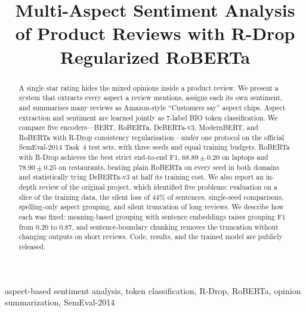 \documentclass[conference]{IEEEtran}
\begin{document}
\title{Multi-Aspect Sentiment Analysis of Product Reviews with R-Drop Regularized RoBERTa}

\author{
\and
{}
\and
{}
\and
{}
}

\maketitle

\begin{abstract}
A single star rating hides the mixed opinions inside a product review. We present a system that extracts every aspect a review mentions, assigns each its own sentiment, and summarises many reviews as Amazon-style ``Customers say'' aspect chips. Aspect extraction and sentiment are learned jointly as 7-label BIO token classification. We compare five encoders---BERT, RoBERTa, DeBERTa-v3, ModernBERT, and RoBERTa with R-Drop consistency regularisation---under one protocol on the official SemEval-2014 Task~4 test sets, with three seeds and equal training budgets. RoBERTa with R-Drop achieves the best strict end-to-end F1, $68.89\pm0.20$ on laptops and $78.90\pm0.25$ on restaurants, beating plain RoBERTa on every seed in both domains and statistically tying DeBERTa-v3 at half its training cost. We also report an in-depth review of the original project, which identified five problems: evaluation on a slice of the training data, the silent loss of 44\% of sentences, single-seed comparisons, spelling-only aspect grouping, and silent truncation of long reviews. We describe how each was fixed: meaning-based grouping with sentence embeddings raises grouping F1 from 0.20 to 0.87, and sentence-boundary chunking removes the truncation without changing outputs on short reviews. Code, results, and the trained model are publicly released.
\end{abstract}

\begin{IEEEkeywords}
aspect-based sentiment analysis, token classification, R-Drop, RoBERTa, opinion summarization, SemEval-2014
\end{IEEEkeywords}
\end{document}
